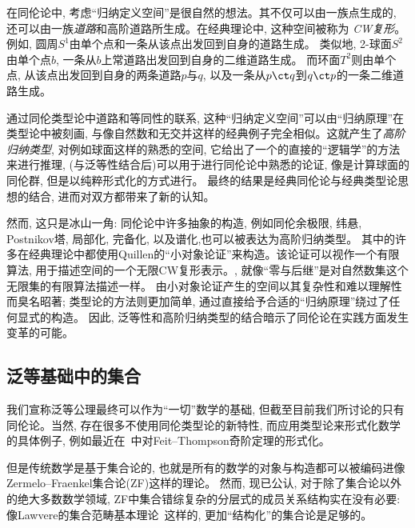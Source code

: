 在同伦论中, 考虑``归纳定义空间''是很自然的想法。其不仅可以由一族点生成的, 还可以由一族\emph{道路}和高阶道路所生成。在经典理论中, 这种空间被称为 \emph{CW复形}。
%
例如, 圆周$S^1$由单个点和一条从该点出发回到自身的道路生成。
类似地, 2-球面$S^2$由单个点$b$, 一条从$b$上常道路出发回到自身的二维道路生成。
而环面$T^2$则由单个点, 从该点出发回到自身的两条道路$p$与$q$, 以及一条从$p \ct q$到$q \ct p$的一条二维道路生成。

通过同伦类型论中道路和等同性的联系, 这种``归纳定义空间''可以由``归纳原理''在类型论中被刻画, 与像自然数和无交并这样的经典例子完全相似。这就产生了\emph{高阶归纳类型},
%
对例如球面这样的熟悉的空间, 它给出了一个的直接的``逻辑学''的方法来进行推理, (与泛等性结合后)可以用于进行同伦论中熟悉的论证, 像是计算球面的同伦群, 但是以纯粹形式化的方式进行。
最终的结果是经典同伦论与经典类型论思想的结合, 进而对双方都带来了新的认知。

然而, 这只是冰山一角: 同伦论中许多抽象的构造, 例如同伦余极限, 纬悬, Postnikov塔, 局部化, 完备化, 以及谱化,也可以被表达为高阶归纳类型。 
其中的许多在经典理论中都使用Quillen的``小对象论证''来构造。该论证可以视作一个有限算法, 用于描述空间的一个无限CW复形表示。,
就像``零与后继''是对自然数集这个无限集的有限算法描述一样。
由小对象论证产生的空间以其复杂性和难以理解性而臭名昭著; 类型论的方法则更加简单, 通过直接给予合适的``归纳原理''绕过了任何显式的构造。
因此, 泛等性和高阶归纳类型的结合暗示了同伦论在实践方面发生变革的可能。

\subsection*{泛等基础中的集合}

%

我们宣称泛等公理最终可以作为``一切''数学的基础, 但截至目前我们所讨论的只有同伦论。当然, 存在很多不使用同伦类型论的新特性, 而应用类型论来形式化数学的具体例子, 
%
%
%
%
%
例如最近在\Coq~\cite{gonthier}中对Feit--Thompson奇阶定理的形式化。

但是传统数学是基于集合论的, 也就是所有的数学的对象与构造都可以被编码进像Zermelo--Fraenkel集合论(ZF)这样的理论。
%
%
%
%
然而, 现已公认, 对于除了集合论以外的绝大多数数学领域, ZF中集合错综复杂的分层式的成员关系结构实在没有必要:
像Lawvere的集合范畴基本理论~\cite{lawvere:etcs-long}这样的, 更加``结构化''的集合论是足够的。
%

